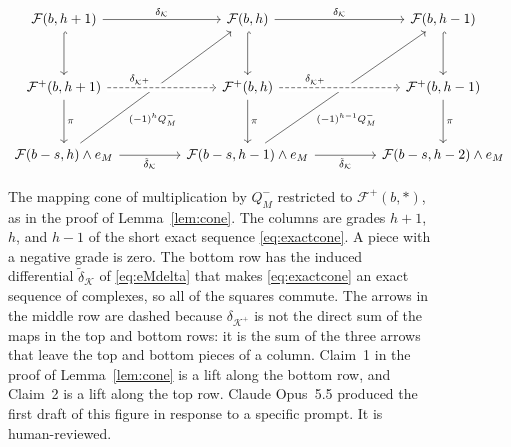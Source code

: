 \documentclass[12pt]{amsart}
\theoremstyle{definition}
\theoremstyle{remark}
\newcommand{\K}{\mathcal K}
\newcommand{\Kplus}{{{\mathcal K}^+}}
\newcommand{\FF}{\mathcal F}
\begin{document}
\begin{figure}[tbp]
\[
\begin{tikzcd}[column sep=4.5em, row sep=3.2em]
\FF(b,h+1) \arrow[r,"\delta_\K"] \arrow[d,hook]
& \FF(b,h) \arrow[r,"\delta_\K"] \arrow[d,hook]
  \arrow[from=ddl,"(-1)^hQ^-_M"' {pos=0.3}]
& \FF(b,h-1) \arrow[d,hook]
  \arrow[from=ddl,"(-1)^{h-1}Q^-_M"' {pos=0.3}] \\
\FF^+(b,h+1) \arrow[r,dashed,"\delta_\Kplus" {pos=0.3}, crossing over] \arrow[d,"\pi"]
& \FF^+(b,h) \arrow[r,dashed,"\delta_\Kplus" {pos=0.3}, crossing over] \arrow[d,"\pi"]
& \FF^+(b,h-1) \arrow[d,"\pi"] \\
\FF(b-s,h)\wedge e_M \arrow[r,"{\tilde \delta}_\K"']
& \FF(b-s,h-1)\wedge e_M \arrow[r,"{\tilde \delta}_\K"']
& \FF(b-s,h-2)\wedge e_M
\end{tikzcd}
\]
\caption{The mapping cone of multiplication by $Q^-_M$
restricted to $\FF^+(b, *)$, as in the
proof of Lemma~\ref{lem:cone}.  The columns are grades $h+1$, $h$, and
$h-1$ of the short exact sequence \eqref{eq:exactcone}.  
A piece with a negative grade is zero.
The bottom row has the induced differential $\tilde \delta_\K$ of \eqref{eq:eMdelta}
that makes \eqref{eq:exactcone} an exact sequence of complexes, 
so all of the squares commute.
The arrows in the middle row are dashed because $\delta_\Kplus$ is not
the direct sum of the maps in the top and bottom rows: it is the sum of
the three arrows that leave the top and bottom pieces of a column.
Claim~1 in the proof of Lemma~\ref{lem:cone} is a lift %
along the bottom row, and Claim~2 is a lift %
along the top row.
Claude Opus~5.5 produced the first draft of this figure
in response to a specific prompt.  It is human-reviewed.}
\label{fig:cone}
\end{figure}
\end{document}
